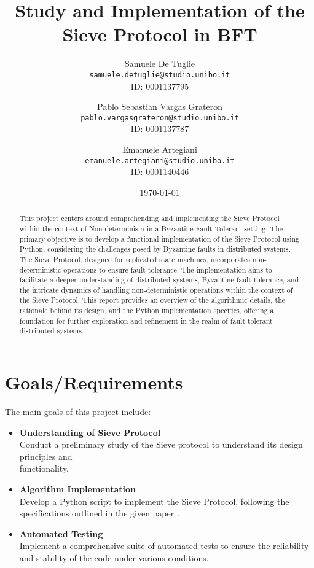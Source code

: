 \documentclass[24pt]{report}
\title{Study and Implementation of the Sieve Protocol in BFT}
\author{
  Samuele De Tuglie \\ \texttt{samuele.detuglie@studio.unibo.it} \\ ID: 0001137795  \\
  \and
  Pablo Sebastian Vargas Grateron \\ \texttt{pablo.vargasgrateron@studio.unibo.it} \\ ID: 0001137787 \\
  \and
  Emanuele Artegiani \\ \texttt{emanuele.artegiani@studio.unibo.it} \\ ID: 0001140446 \\
}
\date{\today}
\begin{document}
\maketitle

\begin{abstract}
This project centers around comprehending and implementing the Sieve Protocol within the context of Non-determinism in a Byzantine Fault-Tolerant setting. The primary objective is to develop a functional implementation of the Sieve Protocol using Python, considering the challenges posed by Byzantine faults in distributed systems. The Sieve Protocol, designed for replicated state machines, incorporates non-deterministic operations to ensure fault tolerance. The implementation aims to facilitate a deeper understanding of distributed systems, Byzantine fault tolerance, and the intricate dynamics of handling non-deterministic operations within the context of the Sieve Protocol. This report provides an overview of the algorithmic details, the rationale behind its design, and the Python implementation specifics, offering a foundation for further exploration and refinement in the realm of fault-tolerant distributed systems.
\end{abstract}

\newpage

\section*{Goals/Requirements}
The main goals of this project include:
\begin{itemize}
    \item \textbf{Understanding of Sieve Protocol} \\
    Conduct a preliminary study of the Sieve protocol to understand its design principles and \\functionality.
    \item \textbf{Algorithm Implementation} \\
    Develop a Python script to implement the Sieve Protocol, following the specifications outlined in the given paper \cite{paper}.
    \item \textbf{Automated Testing} \\
    Implement a comprehensive suite of automated tests to ensure the reliability and stability of the code under various conditions.
\end{itemize}
\end{document}
